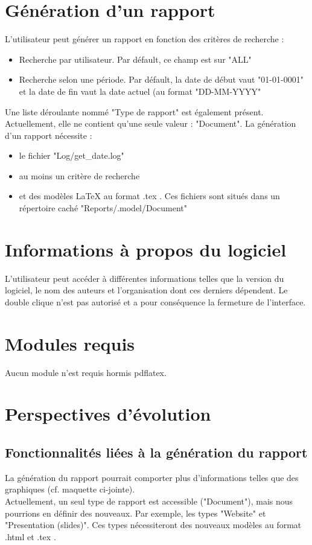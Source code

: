 \documentclass[a4paper,11pt]{article}
\begin{document}
\section{Génération d'un rapport}
	L'utilisateur peut générer un rapport en fonction des critères de recherche :
	\begin{itemize}
		\item Recherche par utilisateur. Par défault, ce champ est sur "ALL"
		\item Recherche selon une période. Par défault, la date de début vaut "01-01-0001" et la date de fin vaut la date actuel (au format "DD-MM-YYYY"
	\end{itemize}
	Une liste déroulante nommé "Type de rapport" est également présent. Actuellement, elle ne contient qu'une seule valeur : "Document".
	La génération d'un rapport nécessite :
	\begin{itemize}
		\item le fichier "Log/get\_date.log"
		\item au moins un critère de recherche
		\item et des modèles LaTeX au format .tex . Ces fichiers sont situés dans un répertoire caché "Reports/.model/Document"
	\end{itemize}

\section{Informations à propos du logiciel}
	L'utilisateur peut accéder à différentes informations telles que la version du logiciel, le nom des auteurs et l'organisation dont ces derniers dépendent. 
	Le double clique n'est pas autorisé et a pour conséquence la fermeture de l'interface.

\section{Modules requis}
	Aucun module n'est requis hormis pdflatex.

\section{Perspectives d'évolution}
	\subsection{Fonctionnalités liées à la génération du rapport}
		La génération du rapport pourrait comporter plus d'informations telles que des graphiques (cf. maquette ci-jointe). \\
		Actuellement, un seul type de rapport est accessible ("Document"), mais nous pourrions en définir des nouveaux. 
		Par exemple, les types "Website" et "Presentation (slides)". Ces types nécessiteront des nouveaux modèles au format .html et .tex .
		
\end{document}
